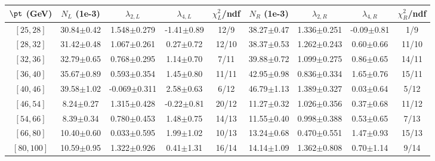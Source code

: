 \begin{tabular}{c||c|c|c|c||c|c|c|c}
$\pt$ (GeV) & $N_L$ (1e-3) & $\lambda_{2,L}$ & $\lambda_{4,L}$  & $\chi^2_L$/ndf & $N_R$ (1e-3) & $\lambda_{2,R}$ & $\lambda_{4,R}$  & $\chi^2_R$/ndf \\
\hline
$[25, 28]$ & 30.84$\pm$0.42 & 1.548$\pm$0.279 & -1.41$\pm$0.89 & 12/9 & 38.27$\pm$0.47 & 1.336$\pm$0.251 & -0.09$\pm$0.81 & 1/9\\
$[28, 32]$ & 31.42$\pm$0.48 & 1.067$\pm$0.261 & 0.27$\pm$0.72 & 12/10 & 38.37$\pm$0.53 & 1.262$\pm$0.243 & 0.60$\pm$0.66 & 11/10\\
$[32, 36]$ & 32.79$\pm$0.65 & 0.768$\pm$0.295 & 1.14$\pm$0.70 & 7/11 & 39.88$\pm$0.72 & 1.099$\pm$0.275 & 0.86$\pm$0.65 & 14/11\\
$[36, 40]$ & 35.67$\pm$0.89 & 0.593$\pm$0.354 & 1.45$\pm$0.80 & 11/11 & 42.95$\pm$0.98 & 0.836$\pm$0.334 & 1.65$\pm$0.76 & 15/11\\
$[40, 46]$ & 39.58$\pm$1.02 & -0.069$\pm$0.311 & 2.58$\pm$0.63 & 6/12 & 46.79$\pm$1.13 & 1.389$\pm$0.327 & 0.03$\pm$0.64 & 5/12\\
$[46, 54]$ & 8.24$\pm$0.27 & 1.315$\pm$0.428 & -0.22$\pm$0.81 & 20/12 & 11.27$\pm$0.32 & 1.026$\pm$0.356 & 0.37$\pm$0.68 & 11/12\\
$[54, 66]$ & 8.39$\pm$0.34 & 0.780$\pm$0.453 & 1.48$\pm$0.75 & 14/13 & 11.55$\pm$0.40 & 0.998$\pm$0.388 & 0.53$\pm$0.65 & 7/13\\
$[66, 80]$ & 10.40$\pm$0.60 & 0.033$\pm$0.595 & 1.99$\pm$1.02 & 10/13 & 13.24$\pm$0.68 & 0.470$\pm$0.551 & 1.47$\pm$0.93 & 15/13\\
$[80, 100]$ & 10.59$\pm$0.95 & 1.322$\pm$0.926 & 0.41$\pm$1.31 & 16/14 & 14.14$\pm$1.09 & 1.362$\pm$0.808 & 0.70$\pm$1.14 & 9/14\\
\end{tabular}
